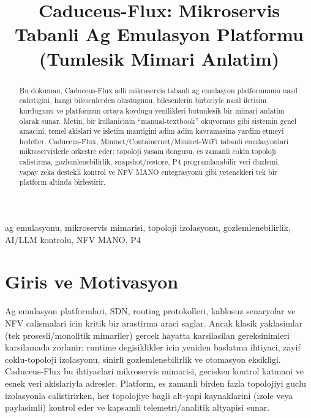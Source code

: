 \documentclass[conference]{IEEEtran}
\begin{document}
\title{Caduceus-Flux: Mikroservis Tabanli Ag Emulasyon Platformu (Tumlesik Mimari Anlatim)}

\author{
}

\maketitle

\begin{abstract}
Bu dokuman, Caduceus-Flux adli mikroservis tabanli ag emulasyon platformunun nasil calistigini, hangi bilesenlerden olustugunu, bilesenlerin birbiriyle nasil iletisim kurdugunu ve platformun ortaya koydugu yenilikleri butunlesik bir mimari anlatim olarak sunar. Metin, bir kullanicinin ``manual-textbook'' okuyormus gibi sistemin genel amacini, temel akislari ve isletim mantigini adim adim kavramasina yardim etmeyi hedefler. Caduceus-Flux, Mininet/Containernet/Mininet-WiFi tabanli emulasyonlari mikroservislerle orkestre eder; topoloji yasam dongusu, es zamanli coklu topoloji calistirma, gozlemlenebilirlik, snapshot/restore, P4 programlanabilir veri duzlemi, yapay zeka destekli kontrol ve NFV MANO entegrasyonu gibi yetenekleri tek bir platform altinda birlestirir.
\end{abstract}

\begin{IEEEkeywords}
ag emulasyonu, mikroservis mimarisi, topoloji izolasyonu, gozlemlenebilirlik, AI/LLM kontrolu, NFV MANO, P4
\end{IEEEkeywords}

\section{Giris ve Motivasyon}
Ag emulasyon platformlari, SDN, routing protokolleri, kablosuz senaryolar ve NFV calismalari icin kritik bir arastirma araci saglar. Ancak klasik yaklasimlar (tek prosesli/monolitik mimariler) gercek hayatta karsilasilan gereksinimleri karsilamada zorlanir: runtime degisiklikler icin yeniden baslatma ihtiyaci, zayif coklu-topoloji izolasyonu, sinirli gozlemlenebilirlik ve otomasyon eksikligi. Caduceus-Flux bu ihtiyaclari mikroservis mimarisi, gecisken kontrol katmani ve esnek veri akislariyla adresler. Platform, es zamanli birden fazla topolojiyi guclu izolasyonla calistirirken, her topolojiye bagli alt-yapi kaynaklarini (izole veya paylasimli) kontrol eder ve kapsamli telemetri/analitik altyapisi sunar.
\end{document}
